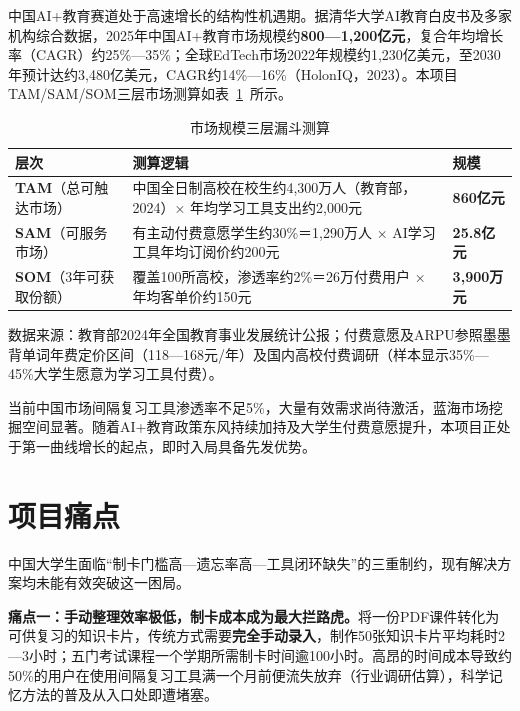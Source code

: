 中国AI+教育赛道处于高速增长的结构性机遇期。据清华大学AI教育白皮书及多家机构综合数据，2025年中国AI+教育市场规模约\textbf{800—1,200亿元}，复合年均增长率（CAGR）约25\%—35\%；全球EdTech市场2022年规模约1,230亿美元，至2030年预计达约3,480亿美元，CAGR约14\%—16\%（HolonIQ，2023）。本项目TAM/SAM/SOM三层市场测算如表~\ref{tab:tam_sam_som}~所示。

\begin{table}[htbp]
  \centering
  \caption{市场规模三层漏斗测算}
  \label{tab:tam_sam_som}
  \begin{tabular}{p{3.2cm}p{7.5cm}p{2.0cm}}
    \toprule
    \textbf{层次} & \textbf{测算逻辑} & \textbf{规模} \\
    \midrule
    \textbf{TAM}（总可触达市场）
      & 中国全日制高校在校生约4,300万人（教育部，2024）× 年均学习工具支出约2,000元
      & \textbf{860亿元} \\[4pt]
    \textbf{SAM}（可服务市场）
      & 有主动付费意愿学生约30\%＝1,290万人 × AI学习工具年均订阅价约200元
      & \textbf{25.8亿元} \\[4pt]
    \textbf{SOM}（3年可获取份额）
      & 覆盖100所高校，渗透率约2\%＝26万付费用户 × 年均客单价约150元
      & \textbf{3,900万元} \\
    \bottomrule
  \end{tabular}
  \begin{flushleft}
    \footnotesize 数据来源：教育部2024年全国教育事业发展统计公报；付费意愿及ARPU参照墨墨背单词年费定价区间（118—168元/年）及国内高校付费调研（样本显示35\%—45\%大学生愿意为学习工具付费）。
  \end{flushleft}
\end{table}

当前中国市场间隔复习工具渗透率不足5\%，大量有效需求尚待激活，蓝海市场挖掘空间显著。随着AI+教育政策东风持续加持及大学生付费意愿提升，本项目正处于第一曲线增长的起点，即时入局具备先发优势。

\section{项目痛点}

中国大学生面临“制卡门槛高—遗忘率高—工具闭环缺失”的三重制约，现有解决方案均未能有效突破这一困局。

\textbf{痛点一：手动整理效率极低，制卡成本成为最大拦路虎。}将一份PDF课件转化为可供复习的知识卡片，传统方式需要\textbf{完全手动录入}，制作50张知识卡片平均耗时2—3小时；五门考试课程一个学期所需制卡时间逾100小时。高昂的时间成本导致约50\%的用户在使用间隔复习工具满一个月前便流失放弃（行业调研估算），科学记忆方法的普及从入口处即遭堵塞。

